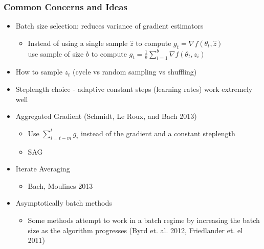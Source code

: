 \documentclass{beamer}
\begin{document}
\begin{frame}
	\frametitle{Common Concerns and Ideas}
	\begin{itemize}
		\pause
		\item Batch size selection: reduces variance of gradient estimators
		\begin{itemize}
			\item Instead of using a single sample $\hat{z}$ to compute $g_t=\nabla f(\theta_t,\hat{z})$ \\
			      use sample of size $b$ to compute $g_t=\frac{1}{b}\sum_{i=1}^b \nabla f(\theta_t,z_i)$
		\end{itemize}
		\pause
		\item How to sample $z_t$ (cycle vs random sampling vs shuffling) 
		\pause
		\item Steplength choice - adaptive constant steps (learning rates) work extremely well
		\pause
		\item Aggregated Gradient (Schmidt, Le Roux, and Bach 2013)
		\begin{itemize}
			\item Use $\sum_{i=t-m}^{t} g_i$ instead of the gradient and a constant steplength
			\item SAG 
		\end{itemize}
		\pause
		\item Iterate Averaging
		\begin{itemize}
			\item Bach, Moulines 2013
		\end{itemize}
		\pause
		\item Asymptotically batch methods
		\begin{itemize}
			\item Some methods attempt to work in a batch regime by increasing the batch size as the algorithm progresses (Byrd et. al. 2012, Friedlander et. el 2011)
		\end{itemize}
	\end{itemize}
\end{frame} 
\end{document}
